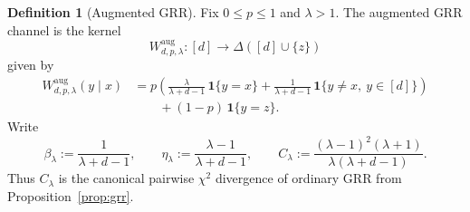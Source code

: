 \documentclass[11pt]{amsart}
\numberwithin{equation}{section}
\theoremstyle{definition}
\newtheorem{definition}[theorem]{Definition}
\newcommand{\one}{\mathbf 1}
\begin{document}
\begin{definition}[Augmented GRR]\label{def:aug-grr}
Fix \(0\le p\le 1\) and \(\lambda>1\).
The augmented GRR channel is the kernel
\[
W^{\mathrm{aug}}_{d,p,\lambda}:[d]\to\Delta([d]\cup\{z\})
\]
given by
\[
\begin{aligned}
W^{\mathrm{aug}}_{d,p,\lambda}(y\mid x)
&=
p\left(
\frac{\lambda}{\lambda+d-1}\,\one\{y=x\}
+
\frac{1}{\lambda+d-1}\,\one\{y\neq x,\ y\in[d]\}
\right)\\
&\qquad +(1-p)\,\one\{y=z\}.
\end{aligned} \tag{10.1}\label{eq:aug-grr}
\]
Write
\[
\beta_\lambda:=\frac{1}{\lambda+d-1},
\qquad
\eta_\lambda:=\frac{\lambda-1}{\lambda+d-1},
\qquad
C_\lambda:=\frac{(\lambda-1)^2(\lambda+1)}{\lambda(\lambda+d-1)}.
\]
Thus \(C_\lambda\) is the canonical pairwise \(\chi^2\) divergence of ordinary GRR from
Proposition~\ref{prop:grr}.
\end{definition}
\end{document}
